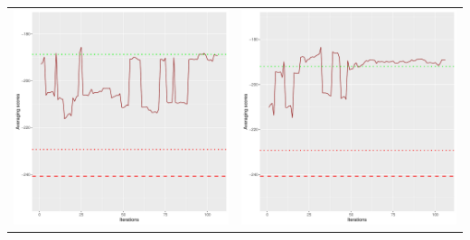 \documentclass[]{scrartcl}
\begin{document}
\begin{table}[h!]
\begin{tabular}{cc}
\includegraphics[scale = 0.4]{./figs/asia/v3/10/avgBoundsEvolution-107.pdf} & 
\includegraphics[scale = 0.4]{./figs/asia/v3/20/avgBoundsEvolution-107.pdf} \\

\end{tabular}
\end{table}
\end{document}
